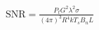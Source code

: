 \documentclass[preview]{standalone}
\begin{document}
\begin{align*}
\text{SNR} = \frac{P_t G^2 \lambda^2 \sigma}{(4 \pi)^3 R^4 k T_s B_n L}
\end{align*}
\end{document}

